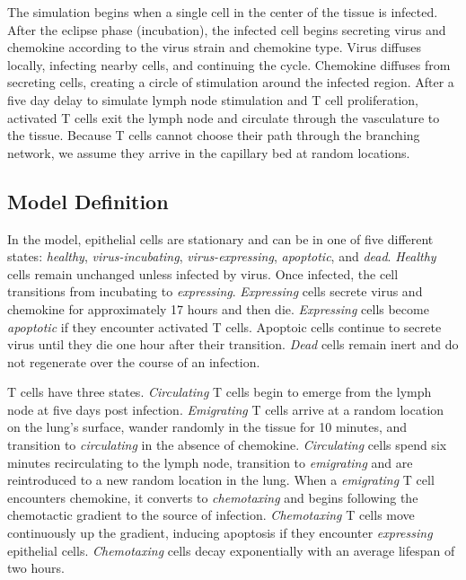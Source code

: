 \documentclass[10pt]{article}
\begin{document}
The simulation begins when a single cell in the center of the tissue is infected. After the eclipse phase (incubation), the infected cell begins secreting virus and chemokine according to the virus strain and chemokine type. Virus diffuses locally, infecting nearby cells, and continuing the cycle. Chemokine diffuses from secreting cells, creating a circle of stimulation around the infected region. After a five day delay to simulate lymph node stimulation and T cell proliferation, activated T cells exit the lymph node and circulate through the vasculature to the tissue. Because T  cells cannot choose their path through the branching network, we assume they arrive in the capillary bed at random locations. 


\subsection*{Model Definition}

In the model, epithelial cells are stationary and can be in one of five different states: \emph{healthy}, \emph{virus-incubating}, \emph{virus-expressing}, \emph{apoptotic}, and \emph{dead}. \emph{Healthy} cells remain unchanged unless infected by virus. Once infected, the cell transitions from {incubating} to \emph{expressing}. \emph{Expressing} cells secrete virus and chemokine for approximately 17 hours and then die. \emph{Expressing} cells become \emph{apoptotic} if they encounter activated T cells. Apoptoic cells continue to secrete virus until they die one hour after their transition. \emph{Dead} cells remain inert and do not regenerate over the course of an infection.

T cells have three states. \emph{Circulating} T cells begin to emerge from the lymph node at five days post infection. \textit{Emigrating} T cells arrive at a random location on the lung's surface, wander randomly in the tissue for 10 minutes, and transition to \emph{circulating} in the absence of chemokine. \emph{Circulating} cells spend six minutes recirculating to the lymph node, transition to \emph{emigrating} and are reintroduced to a new random location in the lung. When a \emph{emigrating} T cell encounters chemokine, it converts to \emph{chemotaxing} and begins following the chemotactic gradient to the source of infection. \emph{Chemotaxing} T cells move continuously up the gradient, inducing apoptosis if they encounter \emph{expressing} epithelial cells. \emph{Chemotaxing} cells decay exponentially with an average lifespan of two hours. 
\end{document}
